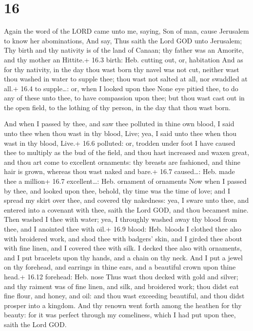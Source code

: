 \hypertarget{section-15}{%
\section{16}\label{section-15}}

 Again the word of the LORD came unto me, saying,
 Son of man, cause Jerusalem to know her abominations,
 And say, Thus saith the Lord GOD unto Jerusalem; Thy birth
and thy nativity is of the land of Canaan; thy father was an Amorite,
and thy mother an Hittite.+ 16.3 birth: Heb. cutting out, or, habitation
 And as for thy nativity, in the day thou wast born thy
navel was not cut, neither wast thou washed in water to supple thee;
thou wast not salted at all, nor swaddled at all.+ 16.4 to supple\ldots:
or, when I looked upon thee  None eye pitied thee, to do any
of these unto thee, to have compassion upon thee; but thou wast cast out
in the open field, to the lothing of thy person, in the day that thou
wast born.

 And when I passed by thee, and saw thee polluted in thine
own blood, I said unto thee when thou wast in thy blood, Live; yea, I
said unto thee when thou wast in thy blood, Live.+ 16.6 polluted: or,
trodden under foot  I have caused thee to multiply as the
bud of the field, and thou hast increased and waxen great, and thou art
come to excellent ornaments: thy breasts are fashioned, and thine hair
is grown, whereas thou wast naked and bare.+ 16.7 caused\ldots: Heb.
made thee a million+ 16.7 excellent\ldots: Heb. ornament of ornaments
 Now when I passed by thee, and looked upon thee, behold,
thy time was the time of love; and I spread my skirt over thee, and
covered thy nakedness: yea, I sware unto thee, and entered into a
covenant with thee, saith the Lord GOD, and thou becamest mine.
 Then washed I thee with water; yea, I throughly washed away
thy blood from thee, and I anointed thee with oil.+ 16.9 blood: Heb.
bloods  I clothed thee also with broidered work, and shod
thee with badgers' skin, and I girded thee about with fine linen, and I
covered thee with silk.  I decked thee also with ornaments,
and I put bracelets upon thy hands, and a chain on thy neck.
 And I put a jewel on thy forehead, and earrings in thine
ears, and a beautiful crown upon thine head.+ 16.12 forehead: Heb. nose
 Thus wast thou decked with gold and silver; and thy
raiment was of fine linen, and silk, and broidered work; thou didst eat
fine flour, and honey, and oil: and thou wast exceeding beautiful, and
thou didst prosper into a kingdom.  And thy renown went
forth among the heathen for thy beauty: for it was perfect through my
comeliness, which I had put upon thee, saith the Lord GOD.

